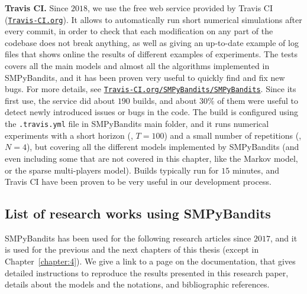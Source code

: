 \textbf{Travis CI.}
Since $2018$, we use the free web service provided by Travis CI (\href{https://travis-ci.org/}{\texttt{Travis-CI.org}}).
It allows to automatically run short numerical simulations after every commit,
in order to check that each modification on any part of the codebase does not break anything, as well as giving an up-to-date example of log files that shows online the results of different examples of experiments. The tests covers all the main models and almost all the algorithms implemented in SMPyBandits, and it has been proven very useful to quickly find and fix new bugs.
For more details, see \href{https://travis-ci.org/SMPyBandits/SMPyBandits}{\texttt{Travis-CI.org/SMPyBandits/SMPyBandits}}.
%
Since its first use, the service did about $190$ builds, and about $30\%$ of them were useful to detect newly introduced issues or bugs in the code.
The build is configured using the \texttt{.travis.yml} file in SMPyBandits main folder, and it runs numerical experiments with a short horizon (\eg, $T=100$) and a small number of repetitions (\ie, $N=4$), but covering all the different models implemented by SMPyBandits (and even including some that are not covered in this chapter, like the Markov model, or the sparse multi-players model).
Builds typically run for $15$ minutes, and Travis CI have been proven to be very useful in our development process.



\subsection{List of research works using SMPyBandits}
\label{sub:3:listResearchWorksUsingSMPyBandits}

SMPyBandits has been used for the following research articles since $2017$, and it is used for the previous and the next chapters of this thesis (except in Chapter~\ref{chapter:4}).
%
We give a link to a page on the documentation, that gives detailed instructions to reproduce the results presented in this research paper, details about the models and the notations, and bibliographic references.

